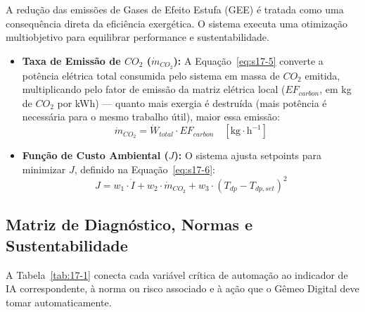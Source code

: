 \documentclass[12pt,a4paper]{article}
\numberwithin{equation}{section}
\numberwithin{table}{section}
\numberwithin{figure}{section}
\begin{document}
A redução das emissões de Gases de Efeito Estufa (GEE) é tratada como uma consequência direta da eficiência exergética. O sistema executa uma otimização multiobjetivo para equilibrar performance e sustentabilidade.

\begin{itemize}
	\item \textbf{Taxa de Emissão de $CO_2$ ($\dot{m}_{CO_2}$):} A Equação~\eqref{eq:s17-5} converte a potência elétrica total consumida pelo sistema em massa de $CO_2$ emitida, multiplicando pelo fator de emissão da matriz elétrica local ($EF_{carbon}$, em kg de $CO_2$ por kWh) — quanto mais exergia é destruída (mais potência é necessária para o mesmo trabalho útil), maior essa emissão:
	\begin{equation}\label{eq:s17-5}
\dot{m}_{CO_2} = \dot{W}_{total} \cdotp EF_{carbon} \quad [\text{kg} \cdotp \text{h}^{-1}]
\end{equation}
	
	\item \textbf{Função de Custo Ambiental ($J$):}
	O sistema ajusta setpoints para minimizar $J$, definido na Equação~\eqref{eq:s17-6}:
	\begin{equation}\label{eq:s17-6}
J = w_1 \cdotp \dot{I} + w_2 \cdotp \dot{m}_{CO_2} + w_3 \cdotp (T_{dp} - T_{dp,set})^2
\end{equation}
\end{itemize}

\subsection{Matriz de Diagnóstico, Normas e Sustentabilidade}

A Tabela~\ref{tab:17-1} conecta cada variável crítica de automação ao indicador de IA correspondente, à norma ou risco associado e à ação que o Gêmeo Digital deve tomar automaticamente.
\begin{table}[h!tbp]
\centering
\noindent{}
\caption[Matriz de diagnóstico e sustentabilidade do Gêmeo Digital]{Matriz de diagnóstico, normas associadas e ações de sustentabilidade do Gêmeo Digital.}
\label{tab:17-1}
\end{table}
\end{document}
